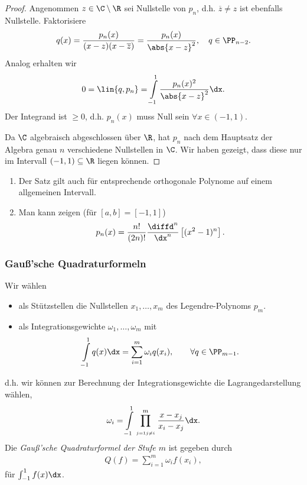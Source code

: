 \begin{proof}
Angenommen $z\in\C\setminus\R$ sei Nullstelle von $p_n$, d.h. $\overline{z}\neq
z$ ist ebenfalls Nullstelle. Faktorisiere
\begin{align*}
q(x) = \frac{p_n(x)}{(x-z)(x-\overline{z})} = \frac{p_n(x)}{\abs{x-z}^2},\quad
q\in\PP_{n-2}.
\end{align*} 
Analog erhalten wir
\begin{align*}
0 = \lin{q,p_n} = \int\limits_{-1}^1 \frac{p_n(x)^2}{\abs{x-z}^2}\dx.
\end{align*}
Der Integrand ist $\ge 0$, d.h. $p_n(x)$ muss Null sein $\forall
x\in(-1,1)$.\dipper

Da $\C$ algebraisch abgeschlossen über $\R$, hat $p_n$ nach dem Hauptsatz der
Algebra genau $n$ verschiedene Nullstellen in $\C$. Wir haben gezeigt, dass
diese nur im Intervall $(-1,1)\subseteq\R$ liegen können.\qedhere
\end{proof}

\begin{bemn}[Bemerkungen.]
\begin{enumerate}[label=\arabic{*})]
  \item Der Satz gilt auch für entsprechende orthogonale Polynome auf einem
  allgemeinen Intervall.
  \item Man kann zeigen (für $[a,b]=[-1,1]$)
  \begin{align*}
  p_n(x) = \frac{n!}{(2n)!}\frac{\diffd^n}{\dx^n}\left[(x^2-1)^n\right].
  \end{align*}
\end{enumerate}
\end{bemn}

\subsubsection{Gauß'sche Quadraturformeln}

Wir wählen
\begin{itemize}[label=\footnotesize\ensuremath{\blacksquare}]
  \item als Stützstellen die Nullstellen $x_1,\ldots,x_m$ des
  Legendre-Polynoms $p_m$.
  \item als Integrationsgewichte $\omega_1,\ldots,\omega_m$ mit
\begin{align*}
\int\limits_{-1}^1 q(x)\dx = \sum\limits_{i=1}^m \omega_i q(x_i),\qquad \forall
q\in\PP_{m-1}.
\end{align*}
\end{itemize}
d.h. wir können zur Berechnung der Integrationsgewichte die Lagrangedarstellung
wählen,
\begin{align*}
\omega_i = \int\limits_{-1}^1 \prod\limits_{\atop{j=1}{j\neq i}}^m
\frac{x-x_j}{x_i-x_j}\dx.
\end{align*}
Die \emph{Gauß'sche Quadraturformel der Stufe $m$} ist gegeben durch
\begin{align*}
Q(f) = \sum\limits_{i=1}^m \omega_i f(x_i),
\end{align*}
für $\int_{-1}^1 f(x)\dx$.

